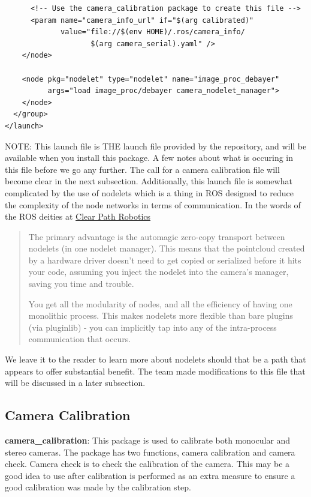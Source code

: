 \begin{itemize}
\begin{lstlisting}
      <!-- Use the camera_calibration package to create this file -->
      <param name="camera_info_url" if="$(arg calibrated)"
             value="file://$(env HOME)/.ros/camera_info/
                    $(arg camera_serial).yaml" />
    </node>

    <node pkg="nodelet" type="nodelet" name="image_proc_debayer"
          args="load image_proc/debayer camera_nodelet_manager">
    </node>
  </group>
</launch>
\end{lstlisting}
NOTE: This launch file is THE launch file provided by the repository, and will be available when you install this package. A few notes about what is occuring in this file before we go any further. The call for a camera calibration file will become clear in the next subsection. Additionally, this launch file is somewhat complicated by the use of nodelets which is a thing in ROS designed to reduce the complexity of the node networks in terms of communication. In the words of the ROS deities at \href{http://www.clearpathrobotics.com/guides/ros/Nodelet%20Everything.html}{Clear Path Robotics}
\begin{quotation}
The primary advantage is the automagic zero-copy transport between nodelets (in one nodelet manager). This means that the pointcloud created by a hardware driver doesn’t need to get copied or serialized before it hits your code, assuming you inject the nodelet into the camera’s manager, saving you time and trouble.

You get all the modularity of nodes, and all the efficiency of having one monolithic process. This makes nodelets more flexible than bare plugins (via pluginlib) - you can implicitly tap into any of the intra-process communication that occurs.
\end{quotation}
We leave it to the reader to learn more about nodelets should that be a path that appears to offer substantial benefit. The team made modifications to this file that will be discussed in a later subsection.
\end{itemize}

\subsection{Camera Calibration}
\noindent \textbf{camera\_calibration}: This package is used to calibrate both monocular and stereo cameras. The package has two functions, camera calibration and camera check. Camera check is to check the calibration of the camera. This may be a good idea to use after calibration is performed as an extra measure to ensure a good calibration was made by the calibration step.\\ 

